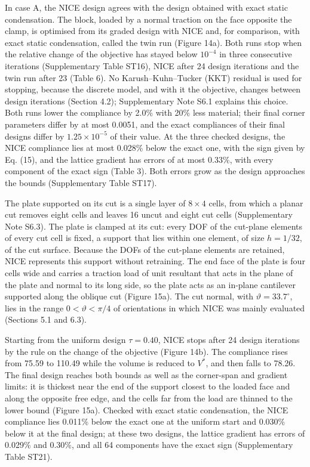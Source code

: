 \documentclass[preprint,12pt,authoryear]{elsarticle}
\begin{document}
In case A, the NICE design agrees with the design obtained with exact static condensation. The block, loaded by a normal traction on the face opposite the clamp, is optimised from its graded design with NICE and, for comparison, with exact static condensation, called the twin run (Figure 14a). Both runs stop when the relative change of the objective has stayed below \(10^{-4}\) in three consecutive iterations (Supplementary Table ST16), NICE after 24 design iterations and the twin run after 23 (Table 6). No Karush--Kuhn--Tucker (KKT) residual is used for stopping, because the discrete model, and with it the objective, changes between design iterations (Section 4.2); Supplementary Note S6.1 explains this choice. Both runs lower the compliance by 2.0\% with 20\% less material; their final corner parameters differ by at most 0.0051, and the exact compliances of their final designs differ by \(1.25\times10^{-5}\) of their value. At the three checked designs, the NICE compliance lies at most 0.028\% below the exact one, with the sign given by Eq. (15), and the lattice gradient has errors of at most 0.33\%, with every component of the exact sign (Table 3). Both errors grow as the design approaches the bounds (Supplementary Table ST17).

The plate supported on its cut is a single layer of \(8\times4\) cells, from which a planar cut removes eight cells and leaves 16 uncut and eight cut cells (Supplementary Note S6.3). The plate is clamped at its cut: every DOF of the cut-plane elements of every cut cell is fixed, a support that lies within one element, of size \(h=1/32\), of the cut surface. Because the DOFs of the cut-plane elements are retained, NICE represents this support without retraining. The end face of the plate is four cells wide and carries a traction load of unit resultant that acts in the plane of the plate and normal to its long side, so the plate acts as an in-plane cantilever supported along the oblique cut (Figure 15a). The cut normal, with \(\vartheta=33.7^\circ\), lies in the range \(0<\vartheta<\pi/4\) of orientations in which NICE was mainly evaluated (Sections 5.1 and 6.3).

Starting from the uniform design \(\tau=0.40\), NICE stops after 24 design iterations by the rule on the change of the objective (Figure 14b). The compliance rises from 75.59 to 110.49 while the volume is reduced to \(V^*\), and then falls to 78.26. The final design reaches both bounds as well as the corner-span and gradient limits: it is thickest near the end of the support closest to the loaded face and along the opposite free edge, and the cells far from the load are thinned to the lower bound (Figure 15a). Checked with exact static condensation, the NICE compliance lies 0.011\% below the exact one at the uniform start and 0.030\% below it at the final design; at these two designs, the lattice gradient has errors of 0.029\% and 0.30\%, and all 64 components have the exact sign (Supplementary Table ST21).
\end{document}
